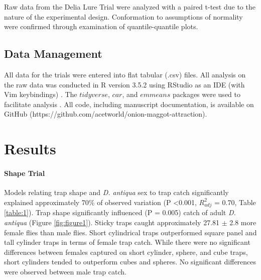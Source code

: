 \documentclass[alpha-refs]{wiley-article}
\begin{document}
Raw data from the Delia Lure Trial were analyzed with a paired t-test due to the nature of the experimental design.  Conformation to assumptions of normality were confirmed through examination of quantile-quantile plots.

\subsection{Data Management}

All data for the trials were entered into flat tabular (.csv) files.  All analysis on the raw data was conducted in R version 3.5.2 using RStudio as an IDE (with Vim keybindings) \citep{rcore2018,rstudio}.  The $tidyverse$, $car$, and $emmeans$ packages were used to facilitate analysis \citep{tidy, car, emmeans}.  All code, including manuscript documentation, is available on GitHub (https://github.com/acetworld/onion-maggot-attraction).

\section{Results}


\paragraph{Shape Trial} Models relating trap shape and \textit{D. antiqua} sex to trap catch significantly explained approximately 70\% of observed variation (P \textless 0.001, $R^2_{adj}$ = 0.70, Table \ref{table:1}).  Trap shape significantly influenced (P = 0.005) catch of adult \textit{D. antiqua} (Figure \ref{fig:figure1}).  Sticky traps caught approximately 27.81 $\pm$ 2.8 more female flies than male flies.  Short cylindrical traps outperformed square panel and tall cylinder traps in terms of female trap catch.  While there were no significant differences between females captured on short cylinder, sphere, and cube traps, short cylinders tended to outperform cubes and spheres.  No significant differences were observed between male trap catch.  
\end{document}
